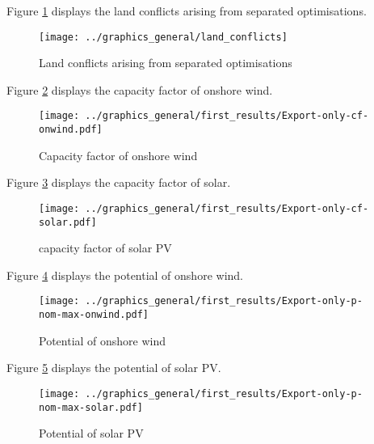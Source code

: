 Figure \ref{fig:land_conflicts} displays the land conflicts arising from separated optimisations.

\begin{figure}[h!]
    \centering
    \texttt{[image: ../graphics\_general/land\_conflicts]}
    \caption{Land conflicts arising from separated optimisations}
    \label{fig:land_conflicts}
\end{figure}


Figure \ref{fig:cf-onwind} displays the capacity factor of onshore wind.

\begin{figure}[h!]
    \centering
    \texttt{[image: ../graphics\_general/first\_results/Export-only-cf-onwind.pdf]}
    \caption{Capacity factor of onshore wind}
    \label{fig:cf-onwind}
\end{figure}


Figure \ref{fig:cf-solar} displays the capacity factor of solar.

\begin{figure}[h!]
    \centering
    \texttt{[image: ../graphics\_general/first\_results/Export-only-cf-solar.pdf]}
    \caption{capacity factor of solar PV}
    \label{fig:cf-solar}
\end{figure}


Figure \ref{fig:p-nom-max-onwind} displays the potential of onshore wind.

\begin{figure}[h!]
    \centering
    \texttt{[image: ../graphics\_general/first\_results/Export-only-p-nom-max-onwind.pdf]}
    \caption{Potential of onshore wind}
    \label{fig:p-nom-max-onwind}
\end{figure}


Figure \ref{fig:p-nom-max-solar} displays the potential of solar PV.

\begin{figure}[h!]
    \centering
    \texttt{[image: ../graphics\_general/first\_results/Export-only-p-nom-max-solar.pdf]}
    \caption{Potential of solar PV}
    \label{fig:p-nom-max-solar}
\end{figure}


